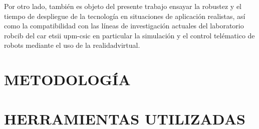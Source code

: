 \documentclass[a4paper, 12pt, spanish, twoside]{article}
\begin{document}
Por otro lado, también es objeto del presente trabajo ensayar la robustez y el tiempo de despliegue de la tecnología en situaciones de aplicación realistas, así como la compatibilidad con las líneas de investigación actuales del laboratorio \acrfull{robcib} del \acrshort{car} \acrshort{etsii} \acrshort{upm}-\acrshort{csic} en particular la simulación y el control telématico de robots mediante el uso de la \gls{realidadvirtual}. 

\clearpage





\newpage
\section{METODOLOGÍA} \label{sec:metodologia}



\clearpage





\newpage
\section{HERRAMIENTAS UTILIZADAS} \label{sec:herramientas}


\end{document}
